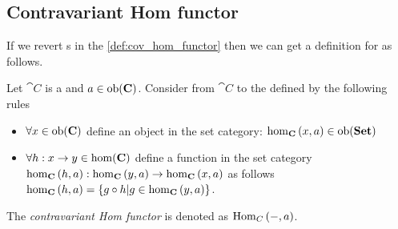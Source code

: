 \subsection{Contravariant Hom functor}
If we revert s in the \cref{def:cov_hom_functor} then we can get
a definition for  as follows.
\begin{definition}
\label{def:con_hom_functor}
Let $\cat{C}$ is a  and $a \in
\mathrm{ob}(\mathbf{C})$. Consider  from $\cat{C}$ to the
 defined by the following rules
\begin{itemize}
\item $\forall x \in \mathrm{ob}(\mathbf{C})$ define an object in the set category:
  $\catmset[C]{x}{a} \in \catob{Set}$ 
\item $\forall h: x \to y \in \mathrm{hom}(\mathbf{C})$ define a function in the set category
  $\catmset[C]{h}{a}: \catmset[C]{y}{a} \to \catmset[C]{x}{a}$ as follows
  $\catmset[C]{h}{a} = \{g \circ h | g \in \catmset[C]{y}{a}\}$.
\end{itemize}  
The \textit{contravariant Hom functor} is denoted as $\mathrm{Hom}_{C}\left(-, a\right)$.
\end{definition}

